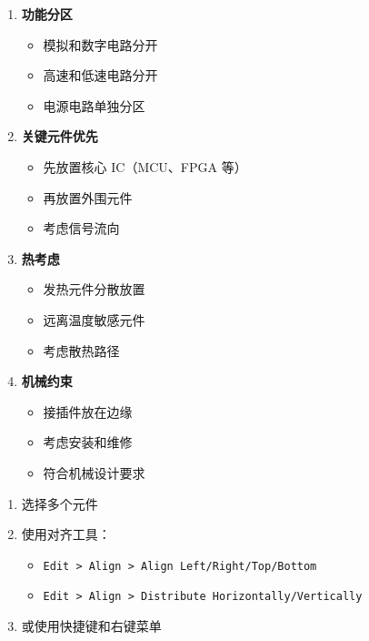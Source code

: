 \begin{enumerate}
  \item \textbf{功能分区}
    \begin{itemize}
      \item 模拟和数字电路分开
      \item 高速和低速电路分开
      \item 电源电路单独分区
    \end{itemize}

  \item \textbf{关键元件优先}
    \begin{itemize}
      \item 先放置核心 IC（MCU、FPGA 等）
      \item 再放置外围元件
      \item 考虑信号流向
    \end{itemize}

  \item \textbf{热考虑}
    \begin{itemize}
      \item 发热元件分散放置
      \item 远离温度敏感元件
      \item 考虑散热路径
    \end{itemize}

  \item \textbf{机械约束}
    \begin{itemize}
      \item 接插件放在边缘
      \item 考虑安装和维修
      \item 符合机械设计要求
    \end{itemize}
\end{enumerate}


\begin{enumerate}
  \item 选择多个元件
  \item 使用对齐工具：
    \begin{itemize}
      \item \lstinline{Edit > Align > Align Left/Right/Top/Bottom}
      \item \lstinline{Edit > Align > Distribute Horizontally/Vertically}
    \end{itemize}
  \item 或使用快捷键和右键菜单
\end{enumerate}


